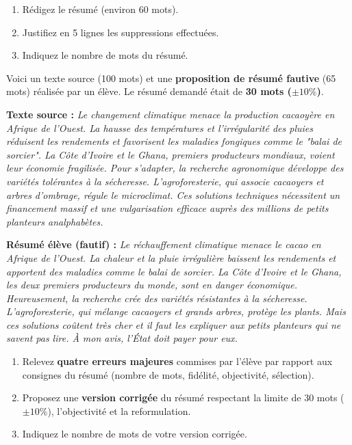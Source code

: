\documentclass[11pt]{article}
\begin{document}
\begin{exercice}
\begin{enumerate}
    \item Rédigez le résumé (environ 60 mots).
    \item Justifiez en 5 lignes les suppressions effectuées.
    \item Indiquez le nombre de mots du résumé.
\end{enumerate}
\end{exercice}

\begin{exercice}
Voici un texte source (100 mots) et une \textbf{proposition de résumé fautive} (65 mots) réalisée par un élève. Le résumé demandé était de \textbf{30 mots ($\pm 10\%$)}.

\textbf{Texte source :}
\textit{Le changement climatique menace la production cacaoyère en Afrique de l'Ouest. La hausse des températures et l'irrégularité des pluies réduisent les rendements et favorisent les maladies fongiques comme le "balai de sorcier". La Côte d'Ivoire et le Ghana, premiers producteurs mondiaux, voient leur économie fragilisée. Pour s'adapter, la recherche agronomique développe des variétés tolérantes à la sécheresse. L'agroforesterie, qui associe cacaoyers et arbres d'ombrage, régule le microclimat. Ces solutions techniques nécessitent un financement massif et une vulgarisation efficace auprès des millions de petits planteurs analphabètes.}

\textbf{Résumé élève (fautif) :}
\textit{Le réchauffement climatique menace le cacao en Afrique de l'Ouest. La chaleur et la pluie irrégulière baissent les rendements et apportent des maladies comme le balai de sorcier. La Côte d'Ivoire et le Ghana, les deux premiers producteurs du monde, sont en danger économique. Heureusement, la recherche crée des variétés résistantes à la sécheresse. L'agroforesterie, qui mélange cacaoyers et grands arbres, protège les plants. Mais ces solutions coûtent très cher et il faut les expliquer aux petits planteurs qui ne savent pas lire. À mon avis, l'État doit payer pour eux.}

\begin{enumerate}
    \item Relevez \textbf{quatre erreurs majeures} commises par l'élève par rapport aux consignes du résumé (nombre de mots, fidélité, objectivité, sélection).
    \item Proposez une \textbf{version corrigée} du résumé respectant la limite de 30 mots ($\pm 10\%$), l'objectivité et la reformulation.
    \item Indiquez le nombre de mots de votre version corrigée.
\end{enumerate}
\end{exercice}
\end{document}
